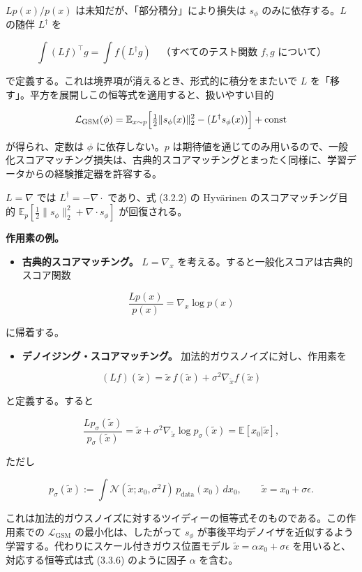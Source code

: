 $Lp(x)/p(x)$ は未知だが、「部分積分」により損失は $s_\phi$ のみに依存する。$L$ の随伴 $L^\dagger$ を

\[
\int (Lf)^\top g = \int f(L^\dagger g)
\quad\text{（すべてのテスト関数 $f,g$ について）}
\]


で定義する。これは境界項が消えるとき、形式的に積分をまたいで $L$ を「移す」。平方を展開しこの恒等式を適用すると、扱いやすい目的

\[
\mathcal{L}_{\mathrm{GSM}}(\phi)
= \mathbb{E}_{x\sim p}\Bigl[\tfrac{1}{2}\|s_\phi(x)\|_2^2 - (L^\dagger s_\phi(x))\Bigr] + \mathrm{const}
\]


が得られ、定数は $\phi$ に依存しない。$p$ は期待値を通じてのみ用いるので、一般化スコアマッチング損失は、古典的スコアマッチングとまったく同様に、学習データからの経験推定器を許容する。

$L=\nabla$ では $L^\dagger=-\nabla\cdot$ であり、式 (3.2.2) の Hyvärinen のスコアマッチング目的 $\mathbb{E}_p[\tfrac{1}{2}\|s_\phi\|_2^2+\nabla\cdot s_\phi]$ が回復される。

\textbf{作用素の例。}

\begin{itemize}
\item \textbf{古典的スコアマッチング。} $L=\nabla_x$ を考える。すると一般化スコアは古典的スコア関数
\end{itemize}


\[
\frac{Lp(x)}{p(x)}=\nabla_x\log p(x)
\]


  に帰着する。

\begin{itemize}
\item \textbf{デノイジング・スコアマッチング。} 加法的ガウスノイズに対し、作用素を
\end{itemize}


\[
(Lf)(\tilde{x})=\tilde{x}\,f(\tilde{x})+\sigma^2\nabla_{\tilde{x}} f(\tilde{x})
\]


  と定義する。すると

\[
\frac{Lp_\sigma(\tilde{x})}{p_\sigma(\tilde{x})}
  = \tilde{x}+\sigma^2\nabla_{\tilde{x}}\log p_\sigma(\tilde{x})
  = \mathbb{E}[x_0|\tilde{x}],
\]


  ただし

\[
p_\sigma(\tilde{x}):=\int\mathcal{N}(\tilde{x};x_0,\sigma^2 I)\,p_{\mathrm{data}}(x_0)\,dx_0,
  \qquad\tilde{x}=x_0+\sigma\epsilon.
\]


  これは加法的ガウスノイズに対するツイディーの恒等式そのものである。この作用素での $\mathcal{L}_{\mathrm{GSM}}$ の最小化は、したがって $s_\phi$ が事後平均デノイザを近似するよう学習する。代わりにスケール付きガウス位置モデル $\tilde{x}=\alpha x_0+\sigma\epsilon$ を用いると、対応する恒等式は式 (3.3.6) のように因子 $\alpha$ を含む。

